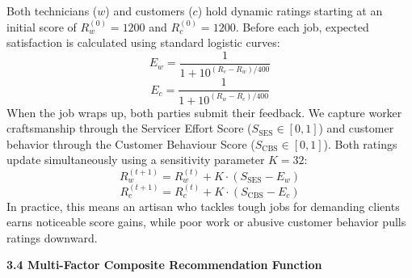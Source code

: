 \documentclass[10pt,twocolumn,a4paper]{article}
\begin{document}
Both technicians ($w$) and customers ($c$) hold dynamic ratings starting at an initial score of $R_w^{(0)} = 1200$ and $R_c^{(0)} = 1200$. Before each job, expected satisfaction is calculated using standard logistic curves:
\begin{equation}
E_w = \frac{1}{1 + 10^{(R_c - R_w)/400}}
\end{equation}
\begin{equation}
E_c = \frac{1}{1 + 10^{(R_w - R_c)/400}}
\end{equation}
When the job wraps up, both parties submit their feedback. We capture worker craftsmanship through the Servicer Effort Score ($S_{\text{SES}} \in [0, 1]$) and customer behavior through the Customer Behaviour Score ($S_{\text{CBS}} \in [0, 1]$). Both ratings update simultaneously using a sensitivity parameter $K = 32$:
\begin{equation}
R_w^{(t+1)} = R_w^{(t)} + K \cdot (S_{\text{SES}} - E_w)
\end{equation}
\begin{equation}
R_c^{(t+1)} = R_c^{(t)} + K \cdot (S_{\text{CBS}} - E_c)
\end{equation}
In practice, this means an artisan who tackles tough jobs for demanding clients earns noticeable score gains, while poor work or abusive customer behavior pulls ratings downward.

\vspace{0.8em}
\noindent
\textbf{3.4 Multi-Factor Composite Recommendation Function}
\end{document}
